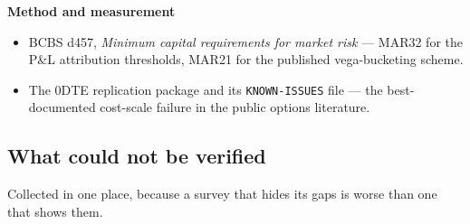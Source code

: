 \documentclass[11pt,a4paper]{article}
\begin{document}
\textbf{Method and measurement}
\begin{itemize}\footnotesize
\item BCBS d457, \emph{Minimum capital requirements for market risk} --- MAR32 for the P\&L attribution thresholds, MAR21 for the published vega-bucketing scheme.
\item The 0DTE replication package and its \texttt{KNOWN-ISSUES} file --- the best-documented cost-scale failure in the public options literature.
\end{itemize}

\subsection{What could not be verified}
\label{app:unverified}

Collected in one place, because a survey that hides its gaps is worse than one that
shows them.
\end{document}
